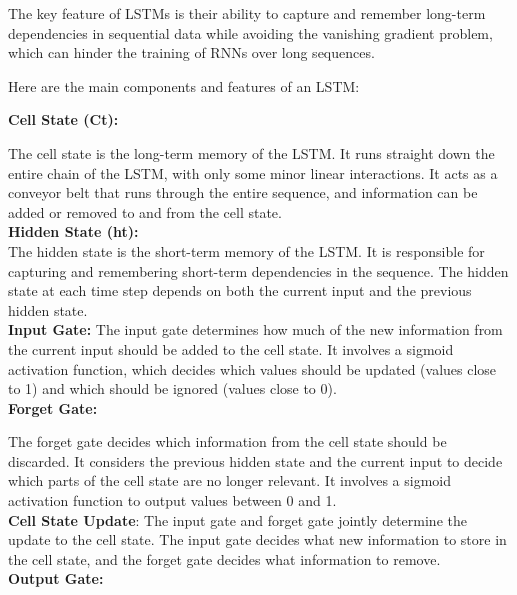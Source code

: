 \begin{itemize}
\begin{itemize}
    The key feature of LSTMs is their ability to capture and remember long-term dependencies in sequential data while avoiding the vanishing gradient problem, which can hinder the training of RNNs over long sequences. \cite{alzubaidi2021review} \cite{madhavan2017deep}
    
    Here are the main components and features of an LSTM:
    
    \textbf{Cell State (Ct):}
    
    The cell state is the long-term memory of the LSTM. It runs straight down the entire chain of the LSTM, with only some minor linear interactions. It acts as a conveyor belt that runs through the entire sequence, and information can be added or removed to and from the cell state.\\
    
    \textbf{Hidden State (ht):}\\
    
    The hidden state is the short-term memory of the LSTM. It is responsible for capturing and remembering short-term dependencies in the sequence. The hidden state at each time step depends on both the current input and the previous hidden state.\\
    \textbf{Input Gate: } 
    The input gate determines how much of the new information from the current input should be added to the cell state. It involves a sigmoid activation function, which decides which values should be updated (values close to 1) and which should be ignored (values close to 0).\\
    \textbf{Forget Gate:}
    
    The forget gate decides which information from the cell state should be discarded. It considers the previous hidden state and the current input to decide which parts of the cell state are no longer relevant. It involves a sigmoid activation function to output values between 0 and 1.\\
    \textbf{Cell State Update}:
    The input gate and forget gate jointly determine the update to the cell state. The input gate decides what new information to store in the cell state, and the forget gate decides what information to remove.\\
    \textbf{Output Gate:}
    

\end{itemize}
\end{itemize}
